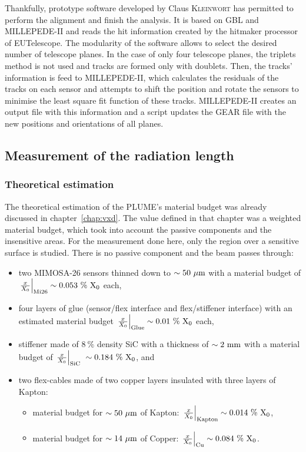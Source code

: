     Thankfully, prototype software developed by Claus \textsc{Kleinwort} has permitted to perform the alignment and finish the analysis. 
    It is based on \gls{GBL} and MILLEPEDE-II and reads the hit information created by the hitmaker processor of EUTelescope. 
    The modularity of the software allows to select the desired number of telescope planes.
    In the case of only four telescope planes, the triplets method is not used and tracks are formed only with doublets.
    Then, the tracks' information is feed to MILLEPEDE-II, which calculates the residuals of the tracks on each sensor and attempts to shift the position and rotate the sensors to minimise the least square fit function of these tracks.
    MILLEPEDE-II creates an output file with this information and a script updates the GEAR file with the new positions and orientations of all planes.


   \subsection{Measurement of the radiation length}

     \subsubsection{Theoretical estimation}

     The theoretical estimation of the \gls{PLUME}'s material budget was already discussed in chapter~\ref{chap:vxd}.
     The value defined in that chapter was a weighted material budget, which took into account the passive components and the insensitive areas.
     For the measurement done here, only the region over a sensitive surface is studied.
     There is no passive component and the beam passes through:
     
     \begin{itemize}
       \item two \gls{MIMOSA}-26 sensors thinned down to $\sim 50~\rm{\mu m}$ with a material budget of $\left. \frac{x}{X_0} \right|_{\rm{Mi26}} \sim 0.053~\%~\rm{X_{0}}$ each,
       \item four layers of glue (sensor/flex interface and flex/stiffener interface) with an estimated material budget $\left. \frac{x}{X_0} \right|_{\rm{Glue}} \sim 0.01~\%~\rm{X_0}$ each, 
       \item stiffener made of $8~\%$ density \gls{SiC} with a thickness of $\sim 2~\rm{mm}$ with a material budget of $\left. \frac{x}{X_0} \right|_{\rm{SiC}} ~\sim 0.184~\%~\rm{X_{0}}$, and
       \item two flex-cables made of two copper layers insulated with three layers of Kapton:
       \begin{itemize}
         \item material budget for $\sim 50~\rm{\mu m}$ of Kapton: $\left. \frac{x}{X_0} \right|_{\rm{Kapton}} \sim 0.014~\%~\rm{X_{0}}$,
         \item material budget for $\sim 14~\rm{\mu m}$ of Copper: $\left. \frac{x}{X_0} \right|_{\rm{Cu}} \sim 0.084~\%~\rm{X_{0}}$.
       \end{itemize}
     \end{itemize}

